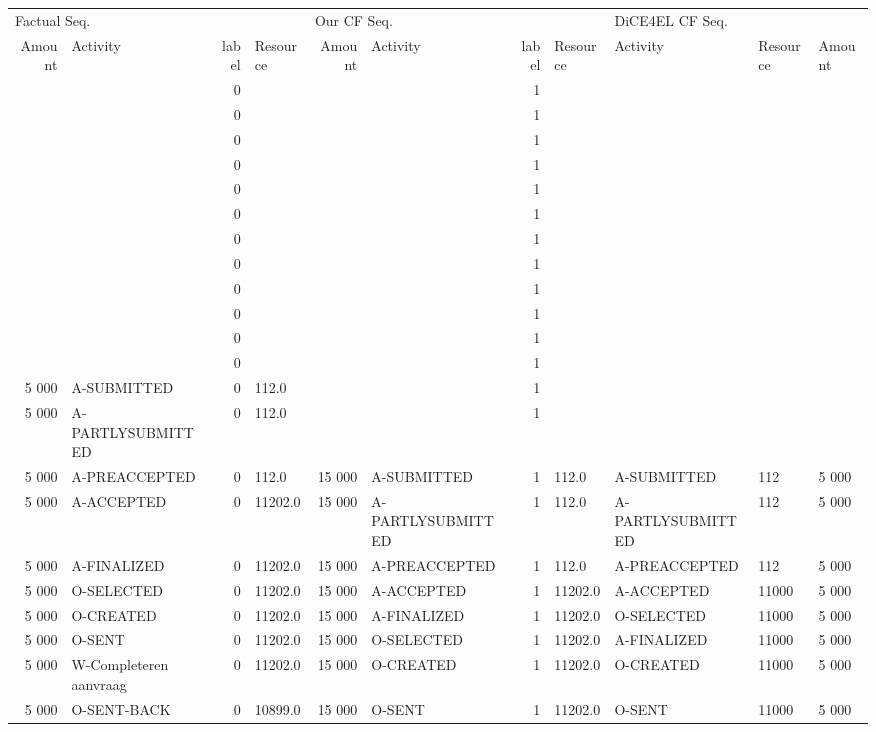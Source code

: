 \begin{tabular}{rlrlrlrllll}
\toprule
\multicolumn{4}{l}{Factual Seq.} & \multicolumn{4}{l}{Our CF Seq.} & \multicolumn{3}{l}{DiCE4EL CF Seq.} \\
Amount & Activity & label & Resource & Amount & Activity & label & Resource & Activity & Resource & Amount \\
\midrule
 &  & 0 &  &  &  & 1 &  &  &  &  \\
 &  & 0 &  &  &  & 1 &  &  &  &  \\
 &  & 0 &  &  &  & 1 &  &  &  &  \\
 &  & 0 &  &  &  & 1 &  &  &  &  \\
 &  & 0 &  &  &  & 1 &  &  &  &  \\
 &  & 0 &  &  &  & 1 &  &  &  &  \\
 &  & 0 &  &  &  & 1 &  &  &  &  \\
 &  & 0 &  &  &  & 1 &  &  &  &  \\
 &  & 0 &  &  &  & 1 &  &  &  &  \\
 &  & 0 &  &  &  & 1 &  &  &  &  \\
 &  & 0 &  &  &  & 1 &  &  &  &  \\
 &  & 0 &  &  &  & 1 &  &  &  &  \\
5 000 & A-SUBMITTED & 0 & 112.0 &  &  & 1 &  &  &  &  \\
5 000 & A-PARTLYSUBMITTED & 0 & 112.0 &  &  & 1 &  &  &  &  \\
5 000 & A-PREACCEPTED & 0 & 112.0 & 15 000 & A-SUBMITTED & 1 & 112.0 & A-SUBMITTED & 112 & 5 000 \\
5 000 & A-ACCEPTED & 0 & 11202.0 & 15 000 & A-PARTLYSUBMITTED & 1 & 112.0 & A-PARTLYSUBMITTED & 112 & 5 000 \\
5 000 & A-FINALIZED & 0 & 11202.0 & 15 000 & A-PREACCEPTED & 1 & 112.0 & A-PREACCEPTED & 112 & 5 000 \\
5 000 & O-SELECTED & 0 & 11202.0 & 15 000 & A-ACCEPTED & 1 & 11202.0 & A-ACCEPTED & 11000 & 5 000 \\
5 000 & O-CREATED & 0 & 11202.0 & 15 000 & A-FINALIZED & 1 & 11202.0 & O-SELECTED & 11000 & 5 000 \\
5 000 & O-SENT & 0 & 11202.0 & 15 000 & O-SELECTED & 1 & 11202.0 & A-FINALIZED & 11000 & 5 000 \\
5 000 & W-Completeren aanvraag & 0 & 11202.0 & 15 000 & O-CREATED & 1 & 11202.0 & O-CREATED & 11000 & 5 000 \\
5 000 & O-SENT-BACK & 0 & 10899.0 & 15 000 & O-SENT & 1 & 11202.0 & O-SENT & 11000 & 5 000 \\

\end{tabular}
